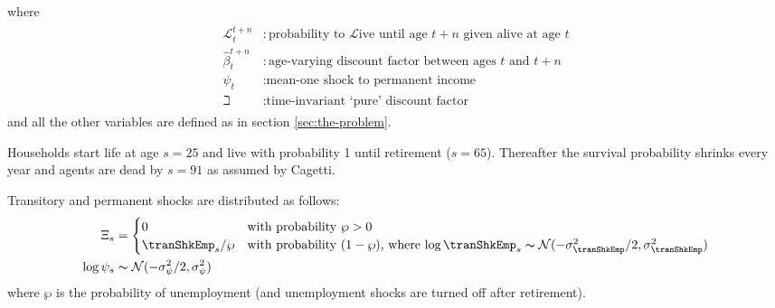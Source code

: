 \documentclass[titlepage, headings=optiontotocandhead]{econtex}
\begin{document}
where
  \begin{equation*}\begin{gathered}\begin{aligned}
        \mathcal{L} _{t}^{t+n} &:\text{probability to }\mathcal{L}\text{ive until age $t+n$ given alive at age $t$}
        \\      \hat{\beta}_{t}^{t+n} &:\text{age-varying discount factor between ages $t$ and $t+n$}
        \\     \psi_{t} &:\text{mean-one shock to permanent income}
        \\     \beth &:\text{time-invariant `pure' discount factor}
      \end{aligned}\end{gathered}\end{equation*}
and all the other variables are defined as in section \ref{sec:the-problem}.

Households start life at age $s=25$ and live with probability 1 until retirement
($s=65$). Thereafter the survival probability shrinks every year and
agents are dead by $s=91$ as assumed by Cagetti. %

  Transitory and permanent shocks are distributed as follows:
  \begin{equation}\begin{gathered}\begin{aligned}
        \Xi_{s} & =
        \begin{cases}
          0\phantom{/\wp} & \text{with probability $\wp>0$} \\
          \tranShkEmp_{s}/\wp      & \text{with probability $(1-\wp)$, where $\log \tranShkEmp_{s}\thicksim \mathcal{N}(-\sigma_{\tranShkEmp}^{2}/2,\sigma_{\tranShkEmp}^{2})$}\\
        \end{cases}\\
        \log \psi_{s} &\thicksim \mathcal{N}(-\sigma_{\psi}^{2}/2,\sigma_{\psi}^{2})
      \end{aligned}\end{gathered}\end{equation}
  where $\wp$ is the probability of unemployment (and unemployment shocks are turned off after retirement).
\end{document}
